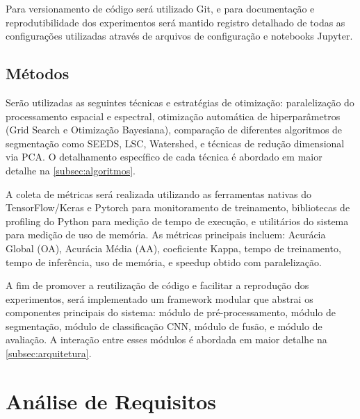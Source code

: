 Para versionamento de código será utilizado Git, e para documentação e reprodutibilidade dos experimentos será mantido registro detalhado de todas as configurações utilizadas através de arquivos de configuração e notebooks Jupyter.

\subsection{Métodos}

Serão utilizadas as seguintes técnicas e estratégias de otimização: paralelização do processamento espacial e espectral, otimização automática de hiperparâmetros (Grid Search e Otimização Bayesiana), comparação de diferentes algoritmos de segmentação como SEEDS, LSC, Watershed, e técnicas de redução dimensional via PCA. O detalhamento específico de cada técnica é abordado em maior detalhe na \autoref{subsec:algoritmos}.

A coleta de métricas será realizada utilizando as ferramentas nativas do TensorFlow/Keras e Pytorch para monitoramento de treinamento, bibliotecas de profiling do Python para medição de tempo de execução, e utilitários do sistema para medição de uso de memória. As métricas principais incluem: Acurácia Global (OA), Acurácia Média (AA), coeficiente Kappa, tempo de treinamento, tempo de inferência, uso de memória, e speedup obtido com paralelização.

A fim de promover a reutilização de código e facilitar a reprodução dos experimentos, será implementado um framework modular que abstrai os componentes principais do sistema: módulo de pré-processamento, módulo de segmentação, módulo de classificação CNN, módulo de fusão, e módulo de avaliação. A interação entre esses módulos é abordada em maior detalhe na \autoref{subsec:arquitetura}.

\section{Análise de Requisitos}
\label{sec:req}

